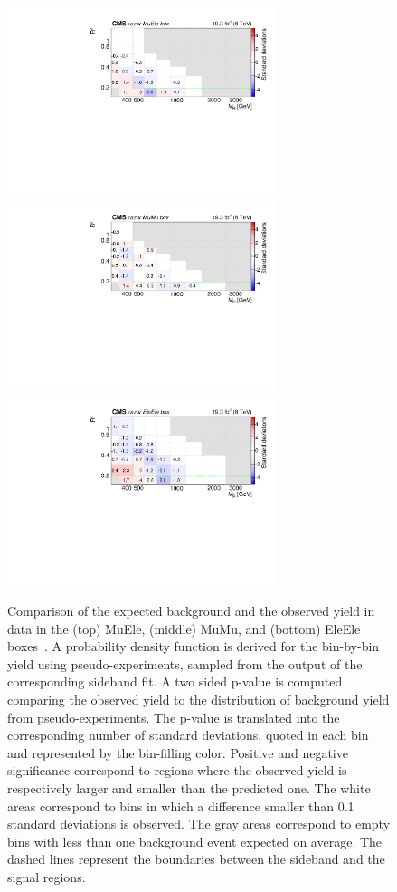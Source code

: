 \begin{figure}[tb!]
\centering
\includegraphics[width=0.7\textwidth]{figs/analysis8TeV/nSigmaLog_MuEle.pdf}
\includegraphics[width=0.7\textwidth]{figs/analysis8TeV/nSigmaLog_MuMu.pdf}
\includegraphics[width=0.7\textwidth]{figs/analysis8TeV/nSigmaLog_EleEle.pdf}
\caption{Comparison of the expected background and the observed yield
  in data in the (top) MuEle, (middle) MuMu, and (bottom)
  EleEle boxes~\cite{razor8TeV,jmgd}. A probability density function is derived for the
  bin-by-bin yield using pseudo-experiments, sampled from the output
  of the corresponding sideband fit. A two sided p-value is computed
  comparing the observed yield to the distribution of background yield
  from pseudo-experiments. The p-value is translated into the
  corresponding number of standard deviations, quoted in each bin and
  represented by the bin-filling color. Positive and negative
  significance correspond to regions where the observed yield is
  respectively larger and smaller than the predicted one. The white areas
  correspond to bins in which a difference smaller than 0.1 standard
  deviations is observed. The gray areas correspond to empty bins with
  less than one background event expected on average. The dashed lines
  represent the boundaries between the sideband and the signal
  regions.\label{fig:FrenchFlagDilep}}


\end{figure}
